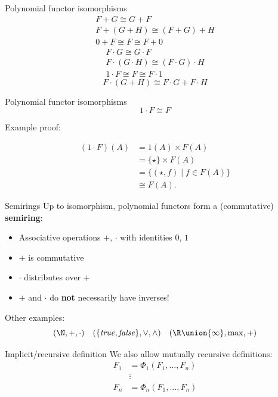 \documentclass[xcolor=svgnames,12pt]{beamer}
\newenvironment{xframe}[1][]
  {\begin{frame}[fragile,environment=xframe,#1]}
  {\end{frame}}
\renewcommand{\emph}{\textbf}
\begin{document}
\begin{xframe}{Polynomial functor isomorphisms}
  \begin{gather*}
    F + G \cong G + F \\
    F + (G + H) \cong (F + G) + H \\
    0 + F \cong F \cong F + 0
  \end{gather*}
  \begin{gather*}
    F \cdot G \cong G \cdot F \\
    F \cdot (G \cdot H) \cong (F \cdot G) \cdot H \\
    1 \cdot F \cong F \cong F \cdot 1
  \end{gather*}
  \[ F \cdot (G + H) \cong F \cdot G + F \cdot H \]
\end{xframe}

\begin{xframe}{Polynomial functor isomorphisms}
\[ 1 \cdot F \cong F \]

Example proof:

  \begin{align*}
    (1 \cdot F)(A) &= 1(A) \times F(A) \\
    &= \{\star\} \times F(A) \\
    &= \{(\star, f) \mid f \in F(A)\} \\
    &\cong F(A).
  \end{align*}
\end{xframe}

\begin{xframe}{Semirings}
  Up to isomorphism, polynomial functors form a (commutative) \emph{semiring}:

  \begin{itemize}
  \item Associative operations $+$, $\cdot$ with identities $0$, $1$
  \item $+$ is commutative
  \item $\cdot$ distributes over $+$
  \item $+$ and $\cdot$ do \emph{not} necessarily have inverses!
  \end{itemize}

  Other examples:
  \[ (\N,+,\cdot)\quad (\{\mathit{true},\mathit{false}\}, \lor, \land)\quad
  (\R \union \{\infty\}, \max, +) \]
\end{xframe}

\begin{xframe}{Implicit/recursive definition}
  We also allow mutually recursive definitions:
  \begin{align*}
    F_1 &= \Phi_1(F_1, \dots, F_n) \\
    &\vdots \\
    F_n &= \Phi_n(F_1, \dots, F_n)
  \end{align*}
\end{xframe}
\end{document}
